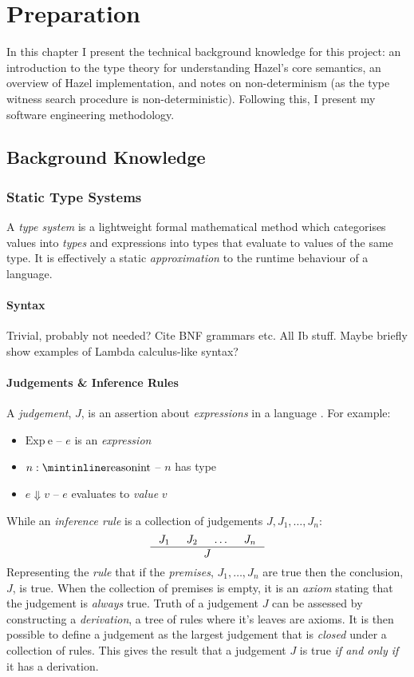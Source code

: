 \chapter{Preparation}
\label{chap:Preparation}
In this chapter I present the technical background knowledge for this project: an introduction to the type theory for understanding Hazel's core semantics, an overview of Hazel implementation, and notes on non-determinism (as the type witness search procedure is non-deterministic). Following this, I present my software engineering methodology.

\section{Background Knowledge}\label{sec:BackgroundKnowledge}
\subsection{Static Type Systems}\label{sec:TypeSystems}
A \textit{type system} is a lightweight formal mathematical method which categorises values into \textit{types} and expressions into types that evaluate to values of the same type. It is effectively a static \textit{approximation} to the runtime behaviour of a language. 

\subsubsection{Syntax}
Trivial, probably not needed? Cite BNF grammars etc. All Ib stuff.
Maybe briefly show examples of Lambda calculus-like syntax?
\subsubsection{Judgements \& Inference Rules}\label{sec:Judgements}
A \textit{judgement}, $J$, is an assertion about \textit{expressions} in a language \cite{PracticalFoundations}. For example: \begin{itemize}
\item $\mathrm{Exp\ e}$ -- $e$ is an \textit{expression} 
\item $n : \code{int}$ -- $n$ has type 
\item $e \Downarrow v$ -- $e$ evaluates to \textit{value} $v$ 
\end{itemize}
While an \textit{inference rule} is a collection of judgements $J, J_1, \dots, J_n$:
\[\inference{J_1 & J_2 & \dots & J_n}{J}\]
Representing the \textit{rule} that if the \textit{premises}, $J_1, \dots, J_n$ are true then the conclusion, $J$, is true. When the collection of premises is empty, it is an \textit{axiom} stating that the judgement is \textit{always} true. Truth of a judgement $J$ can be assessed by constructing a \textit{derivation}, a tree of rules where it's leaves are axioms. It is then possible to define a judgement as the largest judgement that is \textit{closed} under a collection of rules. This gives the result that a judgement $J$ is true \textit{if and only if} it has a derivation.

